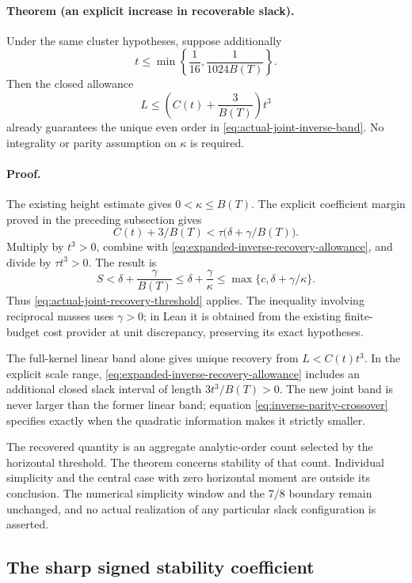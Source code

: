 \paragraph{Theorem (an explicit increase in recoverable slack).}
Under the same cluster hypotheses, suppose additionally
\[
 t\le\min\left\{\frac1{16},\frac1{1024B(T)}\right\}.
\]
Then the closed allowance
\begin{equation}
 L\le\left(C(t)+\frac3{B(T)}\right)t^3
 \label{eq:expanded-inverse-recovery-allowance}
\end{equation}
already guarantees the unique even order in
\eqref{eq:actual-joint-inverse-band}.  No integrality or parity
assumption on \(\kappa\) is required.

\paragraph{Proof.}
The existing height estimate gives \(0<\kappa\le B(T)\).
The explicit coefficient margin proved in the preceding subsection
gives
\[
 C(t)+3/B(T)<\tau\bigl(\delta+\gamma/B(T)\bigr).
\]
Multiply by \(t^3>0\), combine with
\eqref{eq:expanded-inverse-recovery-allowance}, and divide by
\(\tau t^3>0\).  The result is
\[
 S<\delta+\frac{\gamma}{B(T)}
 \le\delta+\frac{\gamma}{\kappa}
 \le\max\{c,\delta+\gamma/\kappa\}.
\]
Thus \eqref{eq:actual-joint-recovery-threshold} applies.
The inequality involving reciprocal masses uses \(\gamma>0\);
in Lean it is obtained from the existing finite-budget cost
provider at unit discrepancy, preserving its exact hypotheses.

The full-kernel linear band alone gives unique recovery from
\(L<C(t)t^3\).  In the explicit scale range,
\eqref{eq:expanded-inverse-recovery-allowance} includes an additional
closed slack interval of length \(3t^3/B(T)>0\).
The new joint band is never larger than the former linear band;
equation \eqref{eq:inverse-parity-crossover} specifies exactly when
the quadratic information makes it strictly smaller.

The recovered quantity is an aggregate analytic-order count
selected by the horizontal threshold.  The theorem concerns
stability of that count.  Individual simplicity and the central
case with zero horizontal moment are outside its conclusion.
The numerical simplicity window and the \(7/8\) boundary remain
unchanged, and no actual realization of any particular slack
configuration is asserted.

\subsection{The sharp signed stability coefficient}
\label{sec:sharp-parity-stability}

